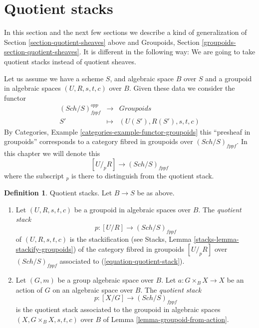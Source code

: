 \documentclass{stacks-project}
\theoremstyle{plain}
\theoremstyle{definition}
\newtheorem{definition}[subsection]{Definition}
\theoremstyle{remark}
\numberwithin{equation}{subsection}
\def\Sch{\mathit{Sch}}
\begin{document}
\section{Quotient stacks}
\label{section-stacks}

\noindent
In this section and the next few sections we describe a kind of
generalization of
Section \ref{section-quotient-sheaves}
above and
Groupoids, Section \ref{groupoids-section-quotient-sheaves}.
It is different in the following way:
We are going to take quotient stacks instead of quotient sheaves.

\medskip\noindent
Let us assume we have a scheme $S$, and algebraic space $B$ over $S$
and a groupoid in algebraic spaces $(U, R, s, t, c)$ over $B$. Given these data
we consider the functor
\begin{equation}
\label{equation-quotient-stack}
\begin{matrix}
(\Sch/S)_{fppf}^{opp} &
\longrightarrow &
\textit{Groupoids} \\
S' &
\longmapsto &
(U(S'), R(S'), s, t, c)
\end{matrix}
\end{equation}
By
Categories, Example \ref{categories-example-functor-groupoids}
this ``presheaf in groupoids'' corresponds to a category fibred in groupoids
over $(\Sch/S)_{fppf}$. In this chapter we will denote
this
$$
[U/_{\!p}R] \to (\Sch/S)_{fppf}
$$
where the subscript ${}_p$ is there to distinguish from the quotient stack.

\begin{definition}
\label{definition-quotient-stack}
Quotient stacks. Let $B \to S$ be as above.
\begin{enumerate}
\item Let $(U, R, s, t, c)$ be a groupoid in algebraic spaces over $B$.
The {\it quotient stack}
$$
p : [U/R] \longrightarrow (\Sch/S)_{fppf}
$$
of $(U, R, s, t, c)$ is the stackification (see
Stacks, Lemma \ref{stacks-lemma-stackify-groupoids})
of the category fibred in groupoids $[U/_{\!p}R]$ over
$(\Sch/S)_{fppf}$ associated to
(\ref{equation-quotient-stack}).
\item Let $(G, m)$ be a group algebraic space over $B$.
Let $a : G \times_B X \to X$ be an action of $G$ on an algebraic space
over $B$. The {\it quotient stack}
$$
p : [X/G] \longrightarrow (\Sch/S)_{fppf}
$$
is the quotient stack associated to the groupoid in algebraic spaces
$(X, G \times_B X, s, t, c)$ over $B$ of
Lemma \ref{lemma-groupoid-from-action}.
\end{enumerate}
\end{definition}
\end{document}
